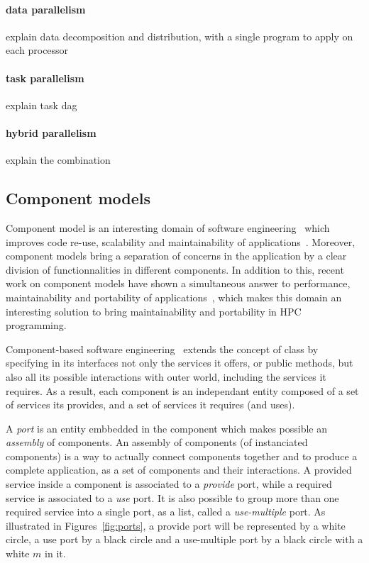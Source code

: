 \paragraph{data parallelism} explain data decomposition and distribution, with a single program to apply on each processor

\paragraph{task parallelism} explain task dag

\paragraph{hybrid parallelism} explain the combination


\subsection{Component models}
Component model is an interesting domain of software engineering~\cite{Szyperski:2002:CSB:515228} which improves code re-use, scalability and maintainability of applications~\cite{Szyperski:2002:CSB:515228,bigot:inria-00388508}. Moreover, component models bring a separation of concerns in the application by a clear division of functionnalities in different components. In addition to this, recent work on component models have shown a simultaneous answer to performance, maintainability and portability of applications~\cite{l2c}, which makes this domain an interesting solution to bring maintainability and portability in HPC programming.

Component-based software engineering~\cite{Szyperski:2002:CSB:515228} extends the concept of class by specifying in its interfaces not only the services it offers, or public methods, but also all its possible interactions with outer world, including the services it requires. As a result, each component is an independant entity composed of a set of services its provides, and a set of services it requires (and uses). 

A \emph{port} is an entity embbedded in the component which makes possible an \emph{assembly} of components. An assembly of components (of instanciated components) is a way to actually connect components together and to produce a complete application, as a set of components and their interactions. A provided service inside a component is associated to a \emph{provide} port, while a required service is associated to a \emph{use} port. It is also possible to group more than one required service into a single port, as a list, called a \emph{use-multiple} port. As illustrated in Figures~\ref{fig:ports}, a provide port will be represented by a white circle, a use port by a black circle and a use-multiple port by a black circle with a white $m$ in it.

